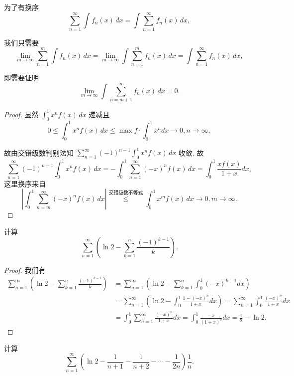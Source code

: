 \documentclass[lang=cn,10pt,thmcnt=section]{elegantbook}
\begin{document}
\begin{remark}
	为了有换序
\[
\sum_{n=1}^\infty \int f_n(x) \, dx = \int \sum_{n=1}^\infty f_n(x) \, dx,
\]

\noindent
我们只需要
\[
\lim_{m\to\infty} \sum_{n=1}^m \int f_n(x) \, dx = \lim_{m\to\infty} \int \sum_{n=1}^m f_n(x) \, dx = \int \sum_{n=1}^\infty f_n(x) \, dx,
\]

\noindent
即需要证明
\[
\lim_{m\to\infty} \int \sum_{n=m+1}^\infty f_n(x) \, dx = 0.
\]

\end{remark}
\begin{proof}
	显然 $\displaystyle\int_0^1 x^n f(x) \, dx$ 递减且
\[
0 \le \int_0^1 x^n f(x) \, dx \le \max f \cdot \int_0^1 x^n dx \to 0, n \to \infty,
\]

\noindent
故由交错级数判别法知 $\displaystyle\sum_{n=1}^\infty (-1)^{n-1} \int_0^1 x^n f(x) \, dx$ 收敛. 故
\[
\sum_{n=1}^\infty (-1)^{n-1} \int_0^1 x^n f(x) \, dx = -\int_0^1 \sum_{n=1}^\infty (-x)^n f(x) \, dx = \int_0^1 \frac{xf(x)}{1+x} dx,
\]
这里换序来自
\[
\left| \int_0^1 \sum_{n=m}^\infty (-x)^n f(x) \, dx \right| \stackrel{\text{交错级数不等式}}{\le} \int_0^1 x^m f(x) \, dx \to 0, m \to \infty.
\]
\end{proof}
\begin{example}
	计算
\[
\sum_{n=1}^{\infty} \left( \ln 2 - \sum_{k=1}^n \frac{(-1)^{k-1}}{k} \right).
\]
\end{example}
\begin{proof}
	我们有
\begin{align*}
    \sum_{n=1}^\infty \left( \ln 2 - \sum_{k=1}^n \frac{(-1)^{k-1}}{k} \right) &= \sum_{n=1}^\infty \left( \ln 2 - \sum_{k=1}^n \int_0^1 (-x)^{k-1} dx \right) \\
    &= \sum_{n=1}^\infty \left( \ln 2 - \int_0^1 \frac{1 - (-x)^n}{1+x} dx \right) = \sum_{n=1}^\infty \int_0^1 \frac{(-x)^n}{1+x} dx \\
    &= \int_0^1 \sum_{n=1}^\infty \frac{(-x)^n}{1+x} dx = \int_0^1 \frac{-x}{(1+x)^2} dx = \frac{1}{2} - \ln 2.
\end{align*}
\end{proof}
\begin{example}
	计算
\[
\sum_{n=1}^{\infty} \left( \ln 2 - \frac{1}{n+1} - \frac{1}{n+2} - \cdots - \frac{1}{2n} \right)\frac{1}{n}.
\]          
\end{example}
\end{document}
